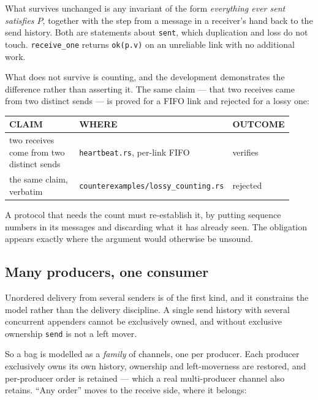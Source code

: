 \documentclass[11pt]{article}
\newcommand{\code}[1]{\texttt{#1}}
\begin{document}
What survives unchanged is any invariant of the form \emph{everything ever sent
satisfies $P$}, together with the step from a message in a receiver's hand back
to the send history. Both are statements about \code{sent}, which duplication
and loss do not touch. \code{receive\_one} returns \code{ok(p.v)} on an unreliable
link with no additional work.

What does not survive is counting, and the development demonstrates the
difference rather than asserting it. The same claim --- that two receives came
from two distinct sends --- is proved for a FIFO link and rejected for a lossy
one:

\begin{center}\small
\begin{tabular}{@{}p{0.46\linewidth}p{0.30\linewidth}p{0.16\linewidth}@{}}
\toprule
\textbf{\sffamily\scriptsize\MakeUppercase{Claim}} &
\textbf{\sffamily\scriptsize\MakeUppercase{Where}} &
\textbf{\sffamily\scriptsize\MakeUppercase{Outcome}} \\
\midrule
two receives come from two distinct sends & \code{heartbeat.rs}, per-link FIFO
& verifies \\
\addlinespace
the same claim, verbatim & \code{counterexamples/}\newline\code{lossy\_counting.rs}
& rejected \\
\bottomrule
\end{tabular}
\end{center}

A protocol that needs the count must re-establish it, by putting sequence
numbers in its messages and discarding what it has already seen. The obligation
appears exactly where the argument would otherwise be unsound.

\subsection*{Many producers, one consumer}

Unordered delivery from several senders is of the first kind, and it constrains
the model rather than the delivery discipline. A single send history with
several concurrent appenders cannot be exclusively owned, and without exclusive
ownership \code{send} is not a left mover.

So a bag is modelled as a \emph{family} of channels, one per producer. Each
producer exclusively owns its own history, ownership and left-moverness are
restored, and per-producer order is retained --- which a real multi-producer
channel also retains. ``Any order'' moves to the receive side, where it belongs:
\end{document}
